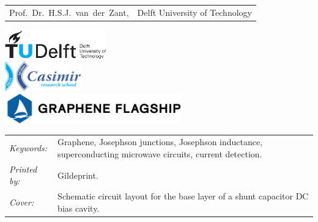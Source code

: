 \begin{titlepage}
\begin{tabular}{p{3.5cm}l}
    Prof.~Dr.~H.S.J.~van~der~Zant, & Delft University of Technology \\

\end{tabular}


\vfill
\begin{center}
    \centering
    \includegraphics[height=0.5in]{title/logos/tudelft}\\
    \vspace{1em}
    \includegraphics[height=0.5in]{title/logos/casimir}\\
    \vspace{1em}
    \includegraphics[height=0.5in]{title/logos/flagship}
\end{center}
\vfill

\noindent
\begin{tabular}{@{}p{}@{}p{}}
    \textit{Keywords:} & Graphene, Josephson junctions, Josephson inductance, superconducting microwave circuits, current detection. \\
    \textit{Printed by:} &  Gildeprint. \\
    \textit{Cover:} & Schematic circuit layout for the base layer of a shunt capacitor DC bias cavity.
\end{tabular}

\vspace{4\bigskipamount}


\end{titlepage}
